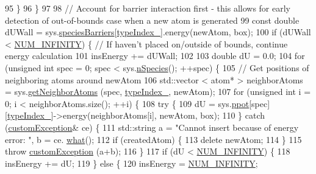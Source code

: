 \begin{DoxyCode}
95         \}
96     \}
97 
98     \textcolor{comment}{// Account for barrier interaction first - this allows for early detection of out-of-bounds case when a
       new atom is generated}
99     \textcolor{keyword}{const} \textcolor{keywordtype}{double} dUWall = sys.\hyperlink{classsim_system_a5ae652ff4519f39c3862abae32a9581b}{speciesBarriers}[\hyperlink{classmc_move_acb731965547b0326ef318ec96da8b46a}{typeIndex\_}].energy(newAtom, box);
100     \textcolor{keywordflow}{if} (dUWall < \hyperlink{potentials_8h_ab94ab1d09e2291d03fe92a0e24a9d33b}{NUM\_INFINITY}) \{ \textcolor{comment}{// If haven't placed on/outside of bounds, continue energy
       calculation}
101         insEnergy += dUWall;
102 
103         \textcolor{keywordtype}{double} dU = 0.0;
104         \textcolor{keywordflow}{for} (\textcolor{keywordtype}{unsigned} \textcolor{keywordtype}{int} spec = 0; spec < sys.\hyperlink{classsim_system_ab5e2e9b6204de15520302fe1d51688dd}{nSpecies}(); ++spec) \{
105             \textcolor{comment}{// Get positions of neighboring atoms around newAtom}
106             std::vector < atom* > neighborAtoms = sys.\hyperlink{classsim_system_a9b3aeefa22c3b50b5913df6eea753bc6}{getNeighborAtoms} (spec, 
      \hyperlink{classmc_move_acb731965547b0326ef318ec96da8b46a}{typeIndex\_}, newAtom);
107             \textcolor{keywordflow}{for} (\textcolor{keywordtype}{unsigned} \textcolor{keywordtype}{int} i = 0; i < neighborAtoms.size(); ++i) \{
108                 \textcolor{keywordflow}{try} \{
109                     dU = sys.\hyperlink{classsim_system_ad2e290b5963f132e6a3a56cee35c8e9f}{ppot}[spec][\hyperlink{classmc_move_acb731965547b0326ef318ec96da8b46a}{typeIndex\_}]->energy(neighborAtoms[i], newAtom, box);
110                 \} \textcolor{keywordflow}{catch} (\hyperlink{classcustom_exception}{customException}& ce) \{
111                     std::string a = \textcolor{stringliteral}{"Cannot insert because of energy error: "}, b = ce.
      \hyperlink{classcustom_exception_aeb6ab5848b038adfc68fde86a512f691}{what}();
112                     \textcolor{keywordflow}{if} (createdAtom) \{
113                         \textcolor{keyword}{delete} newAtom;
114                     \}
115                     \textcolor{keywordflow}{throw} \hyperlink{classcustom_exception}{customException} (a+b);
116                 \}
117                 \textcolor{keywordflow}{if} (dU < \hyperlink{potentials_8h_ab94ab1d09e2291d03fe92a0e24a9d33b}{NUM\_INFINITY}) \{
118                     insEnergy += dU;
119                 \} \textcolor{keywordflow}{else} \{
120                     insEnergy = \hyperlink{potentials_8h_ab94ab1d09e2291d03fe92a0e24a9d33b}{NUM\_INFINITY};

\end{DoxyCode}
